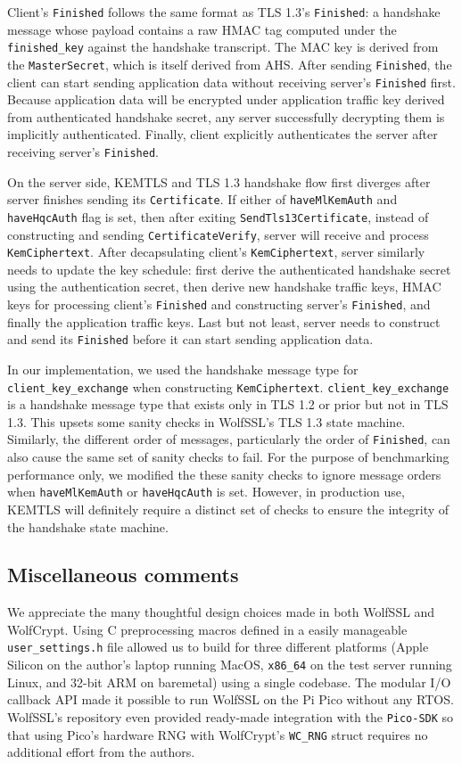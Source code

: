 \documentclass[letterpaper,12pt,titlepage,oneside,final]{book}
\begin{document}
Client's \texttt{Finished} follows the same format as TLS 1.3's \texttt{Finished}: a handshake message whose payload contains a raw HMAC tag computed under the \texttt{finished\_key} against the handshake transcript. 
The MAC key is derived from the \texttt{MasterSecret}, which is itself derived from AHS. 
After sending \texttt{Finished}, the client can start sending application data without receiving server's \texttt{Finished} first.
Because application data will be encrypted under application traffic key derived from authenticated handshake secret, any server successfully decrypting them is implicitly authenticated.
Finally, client explicitly authenticates the server after receiving server's \texttt{Finished}.

On the server side, KEMTLS and TLS 1.3 handshake flow first diverges after server finishes sending its \texttt{Certificate}. 
If either of \texttt{haveMlKemAuth} and \texttt{haveHqcAuth} flag is set, then after exiting \texttt{SendTls13Certificate}, instead of constructing and sending \texttt{CertificateVerify}, server will receive and process \texttt{KemCiphertext}.
After decapsulating client's \texttt{KemCiphertext}, server similarly needs to update the key schedule: first derive the authenticated handshake secret using the authentication secret, then derive new handshake traffic keys, HMAC keys for processing client's \texttt{Finished} and constructing server's \texttt{Finished}, and finally the application traffic keys.
Last but not least, server needs to construct and send its \texttt{Finished} before it can start sending application data.

In our implementation, we used the handshake message type for \texttt{client\_key\_exchange} when constructing \texttt{KemCiphertext}. \texttt{client\_key\_exchange} is a handshake message type that exists only in TLS 1.2 or prior but not in TLS 1.3. 
This upsets some sanity checks in WolfSSL's TLS 1.3 state machine. Similarly, the different order of messages, particularly the order of \texttt{Finished}, can also cause the same set of sanity checks to fail. 
For the purpose of benchmarking performance only, we modified the these sanity checks to ignore message orders when \texttt{haveMlKemAuth} or \texttt{haveHqcAuth} is set.
However, in production use, KEMTLS will definitely require a distinct set of checks to ensure the integrity of the handshake state machine.

\subsection{Miscellaneous comments}
We appreciate the many thoughtful design choices made in both WolfSSL and WolfCrypt. Using C preprocessing macros defined in a easily manageable \texttt{user\_settings.h} file allowed us to build for three different platforms (Apple Silicon on the author's laptop running MacOS, \texttt{x86\_64} on the test server running Linux, and 32-bit ARM on baremetal) using a single codebase. The modular I/O callback API made it possible to run WolfSSL on the Pi Pico without any RTOS. WolfSSL's repository even provided ready-made integration with the \texttt{Pico-SDK} so that using Pico's hardware RNG with WolfCrypt's \texttt{WC\_RNG} struct requires no additional effort from the authors.
\end{document}
